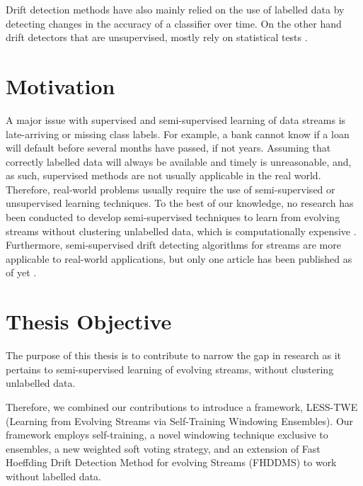 Drift detection methods have also mainly relied on the use of labelled data by detecting changes in the accuracy of a classifier over time. On the other hand drift detectors that are unsupervised, mostly rely on statistical tests \cite{dries2009adaptive, friedman1979multivariate, sheskin2003handbook, sobolewski2013concept}.



\section{Motivation}
A major issue with supervised and semi-supervised learning of data streams is late-arriving or missing class labels. For example, a bank cannot know if a loan will default before several months have passed, if not years. Assuming that correctly labelled data will always be available and timely is unreasonable, and, as such, supervised methods are not usually applicable in the real world. Therefore, real-world problems usually require the use of semi-supervised or unsupervised learning techniques. To the best of our knowledge, no research has been conducted to develop semi-supervised techniques to learn from evolving streams without clustering unlabelled data, which is computationally expensive \cite{krempl2014open}. Furthermore, semi-supervised drift detecting algorithms for streams are more applicable to real-world applications, but only one article has been published as of yet \cite{haque2015sand}.

\section{Thesis Objective}
The purpose of this thesis is to contribute to narrow the gap in research as it pertains to semi-supervised learning of evolving streams, without clustering unlabelled data.

Therefore, we combined our contributions to introduce a framework, LESS-TWE (Learning from Evolving Streams via Self-Training Windowing Ensembles). Our framework employs self-training, a novel windowing technique exclusive to ensembles, a new weighted soft voting strategy, and an extension of Fast Hoeffding Drift Detection Method for evolving Streams (FHDDMS) to work without labelled data.

